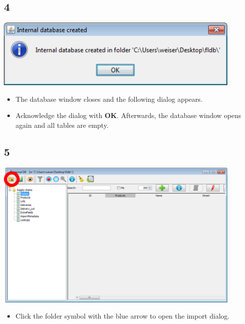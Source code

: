\documentclass{beamer}
\begin{document}
\subsection{4}
\begin{frame}
	\begin{center}
  		\includegraphics[width=0.9\textwidth]{4.png}
	\end{center}
	\begin{itemize}
		\item The database window closes and the following dialog appears.
		\item Acknowledge the dialog with \textbf{OK}. Afterwards, the database window opens again and all tables are empty.
	\end{itemize}
\end{frame}

\subsection{5}
\begin{frame}
	\begin{center}
  		\includegraphics[width=0.9\textwidth]{5.png}
	\end{center}
	\begin{itemize}
		\item Click the folder symbol with the blue arrow to open the import dialog.
	\end{itemize}
\end{frame}
\end{document}
